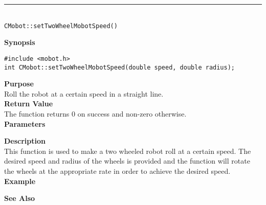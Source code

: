 \noindent
\vspace{5pt}
\rule{4.5in}{0.015in}\\
\noindent
{\LARGE \texttt{CMobot::setTwoWheelMobotSpeed()}}\\
{}

\noindent
{\bf Synopsis}
\vspace{-8pt}
\begin{verbatim}
#include <mobot.h>
int CMobot::setTwoWheelMobotSpeed(double speed, double radius);
\end{verbatim}

\noindent
{\bf Purpose}\\
Roll the robot at a certain speed in a straight line.\\

\noindent
{\bf Return Value}\\
The function returns 0 on success and non-zero otherwise.\\

\noindent
{\bf Parameters}
\vspace{-0.1in}

\noindent
{\bf Description}\\
This function is used to make a two wheeled robot roll at a certain speed. The desired 
speed and radius of the wheels is provided and the function will rotate the wheels at the
appropriate rate in order to achieve the desired speed.
\noindent\\
{\bf Example}\\
\noindent

\noindent
{\bf See Also}\\

